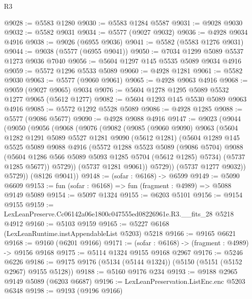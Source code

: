 \begin{lexlean}{R3}
\begin{coremodule}
@9028 := @5583 @1280
@9030 := @5583 @1284 @5587
@9031 := @9028 @9030
@9032 := @5582 @9031
@9034 := @5577 (@9027 @9032)
@9036 := @4928 @9034 @4916
@9038 := @9026 (@6955 @9036)
@9041 := @5582 (@5583 @1276 @9031)
@9044 := @9038 (@5577 (@6955 @9041))
@9050 := @7034 @1299 @5089 @5537 @1273 @9036 @7040
@9056 := @5604 @1297 @145 @5535 @5089 @9034 @4916
@9059 := @5572 @1296 @5533 @5089
@9060 := @4928 @1281
@9061 := @5582 @9030
@9063 := @5577 (@9060 @9061)
@9065 := @4928 @9063 @4916
@9068 := @9059 (@9027 @9065) @9034
@9076 := @5604 @1278 @1295 @5089 @5532 @1277 @9065 (@5612 @1277)
@9082 := @5604 @1293 @145 @5530 @5089 @9063 @4916
@9085 := @5572 @1292 @5528 @5089
@9086 := @4928 @1285
@9088 := @5577 (@9086 @5677)
@9090 := @4928 @9088 @4916
@9147 := @9023
    (@9044
      (@9050
        (@9056
          (@9068
            (@9076
              (@9082
                (@9085
                  (@9060 @9090)
                  @9063
                  (@5604
                    @1282
                    @1291
                    @5089
                    @5527
                    @1281
                    @9090
                    (@5612 @1281)
                    (@5604
                      @1289
                      @145
                      @5525
                      @5089
                      @9088
                      @4916
                      (@5572
                        @1288
                        @5523
                        @5089
                        (@9086 @5704)
                        @9088
                        (@5604 @1286 @566 @5089 @5093 @1285 @5704 (@5612 @1285) @5734)
                        (@5737 @1285 @5677))
                      @5729))
                  (@5737 @1281 @9061))
                @5729))
            (@5737 @1277 @9032))
          @5729))
      (@8126 @9041))
@9148 := (sofar : @6168) -> @6599
@9149 := @5090 @6609
@9153 := fun (sofar : @6168) => fun (fragment : @4989) => @5088 @9149 @5089
@9154 := @5097 @1324
@9155 := @6203 @5101
@9156 := @9154 @9155
@9159 := LexLeanPreserve.Cc06142a06e1800c047555ed08226961e.R3.__fits_28 @5218 @4912
@9160 := @5103 @9159
@9165 := @5227 @6168 (LexLeanRuntime.instAppendableList @5203) @5218
@9166 := @9165 @6621
@9168 := @9160 (@6201 @9166)
@9171 := (sofar : @6168) -> (fragment : @4989) -> @9156 @9168
@9175 := @5114 @1324 @9155 @9168 @2967
@9176 := @5246 @6226
@9186 := @9175 @9176 (@5134 (@5144 @1324)) (@5150 (@5151 (@5152 @2967) @9155 @5128))
@9188 := @5160 @9176 @234
@9193 := @9188 @2965 @9149 @5089 (@6203 @6687)
@9196 := LexLeanPreservation.ListEnc.enc @5203 @6348
@9198 := @9193 (@9196 @9166)

\end{coremodule}
\end{lexlean}

